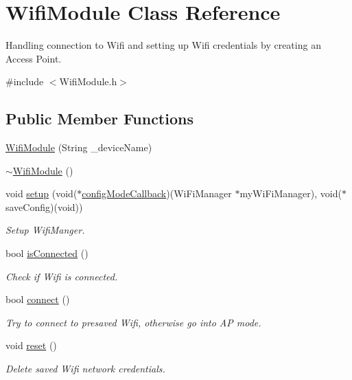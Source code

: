 \hypertarget{class_wifi_module}{}\section{Wifi\+Module Class Reference}
\label{class_wifi_module}


Handling connection to Wifi and setting up Wifi credentials by creating an Access Point.  




{\ttfamily \#include $<$Wifi\+Module.\+h$>$}

\subsection*{Public Member Functions}
\begin{DoxyCompactItemize}
\item 
\mbox{\hyperlink{class_wifi_module_a1fad662191ce40056868f0a21d0b1ef0}{Wifi\+Module}} (String \+\_\+device\+Name)
\item 
\mbox{\hyperlink{class_wifi_module_a13508027d6d44f9ad4adc916a142c4e4}{$\sim$\+Wifi\+Module}} ()
\item 
void \mbox{\hyperlink{class_wifi_module_a78a8fa5090dc159e070d32c957e661dd}{setup}} (void($\ast$\mbox{\hyperlink{main_8cpp_a4aad99c28e20c1b4f8b50e262930e1e5}{config\+Mode\+Callback}})(Wi\+Fi\+Manager $\ast$my\+Wi\+Fi\+Manager), void($\ast$save\+Config)(void))
\begin{DoxyCompactList}\small\item\em Setup Wifi\+Manger. \end{DoxyCompactList}\item 
bool \mbox{\hyperlink{class_wifi_module_a0f9b83f8ed9714183df33e055323261f}{is\+Connected}} ()
\begin{DoxyCompactList}\small\item\em Check if Wifi is connected. \end{DoxyCompactList}\item 
bool \mbox{\hyperlink{class_wifi_module_a408a6374602360051d2791de4f56b067}{connect}} ()
\begin{DoxyCompactList}\small\item\em Try to connect to presaved Wifi, otherwise go into AP mode. \end{DoxyCompactList}\item 
void \mbox{\hyperlink{class_wifi_module_af03089b54800669d9cc57d3ac8bf3188}{reset}} ()
\begin{DoxyCompactList}\small\item\em Delete saved Wifi network credentials. \end{DoxyCompactList}\item 

\end{DoxyCompactItemize}
